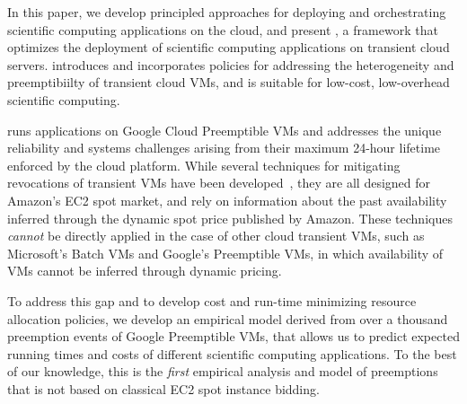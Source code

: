 

%




In this paper, we develop principled approaches for deploying and orchestrating scientific computing applications on the cloud, and present \sysname, a framework that optimizes the deployment of scientific computing applications on transient cloud servers.
%
\sysname introduces and incorporates policies for addressing the heterogeneity and preemptibiilty of transient cloud VMs, and is suitable for low-cost, low-overhead scientific computing. 
%

\sysname runs applications on Google Cloud Preemptible VMs and addresses the unique reliability and systems challenges arising from their maximum 24-hour lifetime enforced by the cloud platform.
While several techniques for mitigating revocations of transient VMs have been developed~\cite{}, they are all designed for Amazon's EC2 spot market, and rely on information about the past availability inferred through the dynamic spot price published by Amazon. 
These techniques \emph{cannot} be directly applied in the case of other cloud transient VMs, such as Microsoft's Batch VMs and Google's Preemptible VMs, in which availability of VMs cannot be inferred through dynamic pricing.

To address this gap and to develop cost and run-time minimizing resource allocation policies,
we develop an empirical model derived from over a thousand preemption events of Google Preemptible VMs, that allows us to predict expected running times and costs of different scientific computing applications. 
To the best of our knowledge, this is the \emph{first} empirical analysis and model of preemptions that is not based on classical EC2 spot instance bidding.

